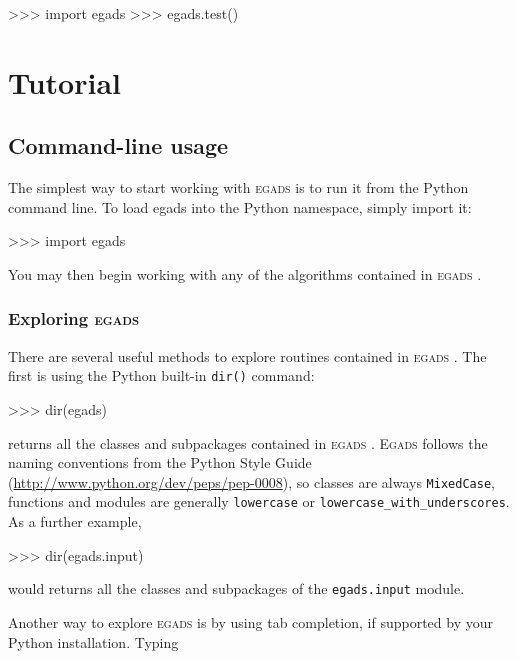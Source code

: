 \documentclass[a4paper,11pt]{report}
\newcommand{\egads}{\textsc{egads} }
\newcommand{\Egads}{\textsc{Egads} }
\begin{document}
\begin{command}
   >>> import egads
   >>> egads.test()
\end{command} 

\chapter{Tutorial}

\section{Command-line usage}
The simplest way to start working with \egads is to run it from the Python command line. To load egads into the Python namespace, simply import it:

\begin{command}
    >>> import egads
\end{command}
You may then begin working with any of the algorithms contained in \egads.

\subsection{Exploring \egads}
There are several useful methods to explore routines contained in \egads. The first is using the Python built-in \verb|dir()| command:

\begin{command}
    >>> dir(egads)
\end{command}
returns all the classes and subpackages contained in \egads. \Egads follows the naming conventions from the Python Style Guide (\href{http://www.python.org/dev/peps/pep-0008}{http://www.python.org/dev/peps/pep-0008}), so classes are always \verb|MixedCase|, functions and modules are generally \verb|lowercase| or \verb|lowercase_with_underscores|. As a further example,

\begin{command}
    >>> dir(egads.input)
\end{command}
would returns all the classes and subpackages of the \verb|egads.input| module.

Another way to explore \egads is by using tab completion, if supported by your Python installation. Typing 
\end{document}
